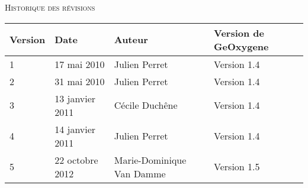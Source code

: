 
\begin{center}

\textsc{\Large Historique des révisions}\\[0.5cm]

\bigskip
\bigskip
\bigskip

\begin{tabular}[!t]{|l||l|l|l|}
\hline
\textbf{Version}&\textbf{Date}&\textbf{Auteur}&\textbf{Version de GeOxygene}\\
\hline
\hline
1&17 mai 2010&Julien Perret&Version 1.4\\
2&31 mai 2010&Julien Perret&Version 1.4\\
3&13 janvier 2011&Cécile Duch\^ene&Version 1.4\\
4&14 janvier 2011&Julien Perret&Version 1.4\\
5&22 octobre 2012&Marie-Dominique Van Damme&Version 1.5\\
\hline
\end{tabular} 

\end{center}
